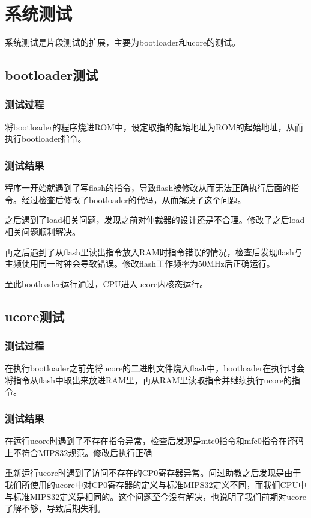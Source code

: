 \section{系统测试}

系统测试是片段测试的扩展，主要为bootloader和ucore的测试。

\subsection{bootloader测试}

\subsubsection{测试过程}

将bootloader的程序烧进ROM中，设定取指的起始地址为ROM的起始地址，从而执行bootloader指令。

\subsubsection{测试结果}

程序一开始就遇到了写flash的指令，导致flash被修改从而无法正确执行后面的指令。经过检查后修改了bootloader的代码，从而解决了这个问题。

之后遇到了load相关问题，发现之前对仲裁器的设计还是不合理。修改了之后load相关问题顺利解决。

再之后遇到了从flash里读出指令放入RAM时指令错误的情况，检查后发现flash与主频使用同一时钟会导致错误。修改flash工作频率为50MHz后正确运行。

至此bootloader运行通过，CPU进入ucore内核态运行。

\subsection{ucore测试}

\subsubsection{测试过程}

在执行bootloader之前先将ucore的二进制文件烧入flash中，bootloader在执行时会将指令从flash中取出来放进RAM里，再从RAM里读取指令并继续执行ucore的指令。

\subsubsection{测试结果}

在运行ucore时遇到了不存在指令异常，检查后发现是mtc0指令和mfc0指令在译码上不符合MIPS32规范。修改后执行正确

重新运行ucore时遇到了访问不存在的CP0寄存器异常。问过助教之后发现是由于我们所使用的ucore中对CP0寄存器的定义与标准MIPS32定义不同，而我们CPU中与标准MIPS32定义是相同的。这个问题至今没有解决，也说明了我们前期对ucore了解不够，导致后期失利。